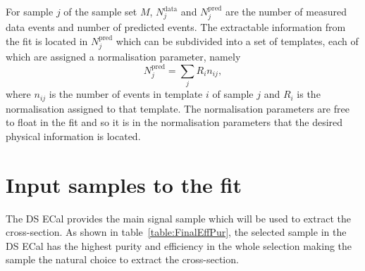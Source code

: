 For sample $j$ of the sample set $M$, $N^{\textrm{data}}_j$ and $N^{\textrm{pred}}_j$ are the number of measured data events and number of predicted events.  The extractable information from the fit is located in $N^{\textrm{pred}}_j$ which can be subdivided into a set of templates, each of which are assigned a normalisation parameter, namely
\begin{equation}
  N^{\textrm{pred}}_j = \sum_j R_{i}n_{ij},
  \label{eqn:NPredDef}
\end{equation}
where $n_{ij}$ is the number of events in template $i$ of sample $j$ and $R_{i}$ is the normalisation assigned to that template.  The normalisation parameters are free to float in the fit and so it  is in the normalisation parameters that the desired physical information is located.
\section{Input samples to the fit}
\label{sec:InputSamples}
The DS ECal provides the main signal sample which will be used to extract the cross-section.  As shown in table~\ref{table:FinalEffPur}, the selected sample in the DS ECal has the highest purity and efficiency in the whole selection making the sample the natural choice to extract the cross-section.
\newline
\newline
